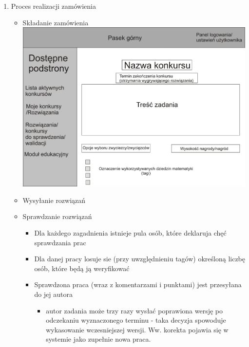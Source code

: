 \documentclass{article}
\begin{document}
\begin{enumerate}
\begin{enumerate}
\begin{itemize}
     \end{itemize}
     \newpage
     \item Proces realizacji zamówienia
     \begin{itemize}
      \item Składanie zamówienia\\
	    \includegraphics[scale=0.5]{IO_rysunki3.jpg}  
      \item Wysyłanie rozwiązań
      \item Sprawdzanie rozwiązań
	\begin{itemize}
	 \item Dla każdego zagadnienia istnieje pula osób, które deklaruja chęć sprawdzania prac
	 \item Dla danej pracy losuje sie (przy uwzględnieniu tagów) określoną liczbę osób, które będą ją weryfikować
	 \item Sprawdzona praca (wraz z komentarzami i punktami) jest przesyłana do jej autora
	 \begin{itemize}
	  \item autor zadania może trzy razy wysłać poprawiona wersję po odczekaniu wyznaczonego terminu - taka decyzja spowoduje wykasowanie wczesniejszej wersji.
	  Ww. korekta pojawia się w systemie jako zupełnie nowa praca.
	 \end{itemize}


\end{itemize}
\end{itemize}
\end{enumerate}
\end{enumerate}
\end{document}
